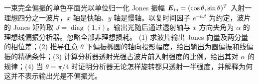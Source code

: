 一束完全偏振的单色平面光以单位归一化 Jones 振幅 \(\boldsymbol E_{\rm in}=(\cos\theta,\sin\theta)^T\) 入射一理想四分之一波片，\(x\) 轴是快轴、\(y\) 轴是慢轴。以复时间因子 \(e^{-i\omega t}\) 为约定，波片的 Jones 矩阵取 \(J=\operatorname{diag}(1,i)\)。输出光随后通过透射轴与 \(x\) 方向夹角为 \(\alpha\) 的理想线偏振分析器。忽略全部非理想损耗。
(1) 求波片输出 Jones 向量及两分量的相位差；(2) 推导任意 \(\theta\) 下偏振椭圆的轴向投影幅度，给出输出为圆偏振和线偏振的精确条件；(3) 计算分析器透射光强占波片前入射强度的比例，给出其对 \(\alpha\) 的规律；(4) 当 \(\theta=\pi/4\) 时证明分析器无论怎样旋转都只透射一半强度，并解释为何这并不表示输出光是不偏振光。

